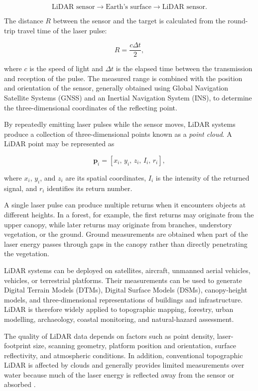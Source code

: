 \documentclass[11pt,a4paper]{article}
\begin{document}
\[
\text{LiDAR sensor}
\longrightarrow
\text{Earth's surface}
\longrightarrow
\text{LiDAR sensor}.
\]

The distance \(R\) between the sensor and the target is calculated from
the round-trip travel time of the laser pulse:

\[
R = \frac{c\Delta t}{2},
\]

where \(c\) is the speed of light and \(\Delta t\) is the elapsed time
between the transmission and reception of the pulse. The measured range
is combined with the position and orientation of the sensor, generally
obtained using Global Navigation Satellite Systems (GNSS) and an
Inertial Navigation System (INS), to determine the three-dimensional
coordinates of the reflecting point.

By repeatedly emitting laser pulses while the sensor moves, LiDAR
systems produce a collection of three-dimensional points known as a
\textit{point cloud}. A LiDAR point may be represented as

\[
\mathbf{p}_i =
\left[
x_i,\,
y_i,\,
z_i,\,
I_i,\,
r_i
\right],
\]

where \(x_i\), \(y_i\), and \(z_i\) are its spatial coordinates,
\(I_i\) is the intensity of the returned signal, and \(r_i\) identifies
its return number.

A single laser pulse can produce multiple returns when it encounters
objects at different heights. In a forest, for example, the first
returns may originate from the upper canopy, while later returns may
originate from branches, understory vegetation, or the ground. Ground
measurements are obtained when part of the laser energy passes through
gaps in the canopy rather than directly penetrating the vegetation.

LiDAR systems can be deployed on satellites, aircraft, unmanned aerial
vehicles, vehicles, or terrestrial platforms. Their measurements can be
used to generate Digital Terrain Models (DTMs), Digital Surface Models
(DSMs), canopy-height models, and three-dimensional representations of
buildings and infrastructure. LiDAR is therefore widely applied to
topographic mapping, forestry, urban modelling, archaeology, coastal
monitoring, and natural-hazard assessment.

The quality of LiDAR data depends on factors such as point density,
laser-footprint size, scanning geometry, platform position and
orientation, surface reflectivity, and atmospheric conditions. In
addition, conventional topographic LiDAR is affected by clouds and
generally provides limited measurements over water because much of the
laser energy is reflected away from the sensor or absorbed
\cite{usgs_lidar_data}.
\end{document}
